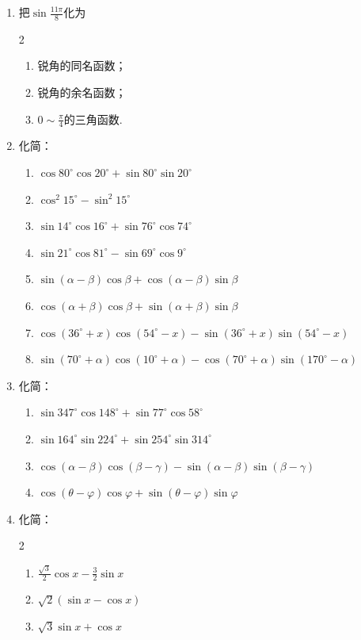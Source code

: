 \begin{enumerate}
    \item 把$\sin\frac{11\pi}{8}$化为
\begin{multicols}{2}
\begin{enumerate}[(1)]
    \item 锐角的同名函数；
    \item 锐角的余名函数；
    \item $0\sim \frac{\pi}{4}$的三角函数.
\end{enumerate}
\end{multicols}

\item 化简：
\begin{enumerate}[(1)]
    \item $\cos80^{\circ}\cos20^{\circ}+\sin80^{\circ}\sin20^{\circ}$
    \item $\cos^{2}15^{\circ}-\sin^{2}15^{\circ}$
    \item $\sin14^{\circ}\cos16^{\circ}+\sin76^{\circ}\cos74^{\circ}$ 
    \item $\sin21^{\circ}\cos81^{\circ}-\sin69^{\circ}\cos9^{\circ}$ 
    \item $\sin\left(\alpha-\beta\right)\cos\beta+\cos\left(\alpha-\beta\right)\sin\beta$ 
    \item $\cos\left(\alpha+\beta\right)\cos\beta+\sin\left(\alpha+\beta\right)\sin\beta$ 
    \item $\cos\left(36^{\circ}+x\right)\cos\left(54^{\circ}-x\right)-\sin(36^{\circ}+x)\sin(54^{\circ}-x)$
    \item $\sin\left(70^{\circ}+\alpha\right)\cos\left(10^{\circ}+\alpha\right)-\cos\left(70^{\circ}+\alpha\right)\sin\left(170^{\circ}-\alpha\right)$
\end{enumerate}

\item 化简：
\begin{enumerate}[(1)]
    \item $\sin347^{\circ}\cos148^{\circ}+\sin77^{\circ}\cos58^{\circ}$
    \item $\sin164^{\circ}\sin224^{\circ}+\sin254^{\circ}\sin314^{\circ}$
    \item $\cos(\alpha-\beta)\cos(\beta-\gamma)-\sin(\alpha-\beta)\sin(\beta-\gamma)$
    \item $\cos(\theta-\varphi)\cos\varphi+\sin(\theta-\varphi)\sin\varphi$
\end{enumerate}

\item 化简：
\begin{multicols}{2}
\begin{enumerate}[(1)]
    \item $\frac{\sqrt{3}}{2}\cos x-\frac{3}{2}\sin x$
    \item $\sqrt{2}(\sin x-\cos x)$
    \item $\sqrt{3}\sin x+\cos x$
\end{enumerate}
\end{multicols}


\end{enumerate}
